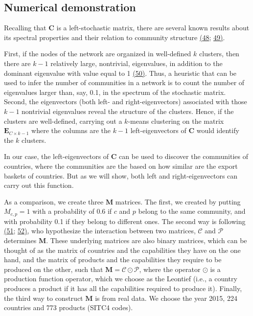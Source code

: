 \documentclass{pnastwo}
\newcommand{\mtx}[1]{\mathbf{ #1}}
\begin{document}
\begin{article}
\subsection{Numerical demonstration}
Recalling that $\mtx{C}$ is a left-stochastic matrix, there are several known results about its spectral properties and their relation to community structure \hyperref[csl:48]{(48}; \hyperref[csl:49]{49)}. 

First, if the nodes of the network are organized in well-defined $k$ clusters, then there are $k-1$ relatively large, nontrivial, eigenvalues, in addition to the dominant eigenvalue with value equal to 1 \hyperref[csl:50]{(50)}. Thus, a heuristic that can be used to infer the number of communities in a network is to count the number of eigenvalues larger than, say, 0.1, in the spectrum of the stochastic matrix. Second, the eigenvectors (both left- and right-eigenvectors) associated with those $k-1$ nontrivial eigenvalues reveal the structure of the clusters. Hence, if the clusters are well-defined, carrying out a $k$-means clustering on the matrix $\mtx{E}_{C\times k-1}$ where the columns are the $k-1$ left-eigenvectors of $\mtx{C}$ would identify the $k$ clusters.

In our case, the left-eigenvectors of $\mtx{C}$ can be used to discover the communities of countries, where the communities are the based on how similar are the export baskets of countries. But as we will show, both left and right-eigenvectors can carry out this function.

As a comparison, we create three $\mtx{M}$ matrices. The first, we created by putting $M_{c,p}=1$ with a probability of 0.6 if $c$ and $p$ belong to the same community, and with probability 0.1 if they belong to different ones. The second way is following \hyperref[csl:51]{(51}; \hyperref[csl:52]{52)}, who hypothesize the interaction between two matrices, $\mtx{{\mathcal C}}$ and $\mtx{{\mathcal P}}$ determines $\mtx{M}$. These underlying matrices are also binary matrices, which can be thought of as the matrix of countries and the capabilities they have on the one hand, and the matrix of products and the capabilities they require to be produced on the other, such that $\mtx{M}=\mtx{{\mathcal C}} \odot \mtx{{\mathcal P}}$, where the operator $\odot$ is a production function operator, which we choose as the Leontief (i.e., a country produces a product if it has all the capabilities required to produce it). Finally, the third way to construct $\mtx{M}$ is from real data. We choose the year 2015, 224 countries and 773 products (SITC4 codes). 





\end{article}
\end{document}
